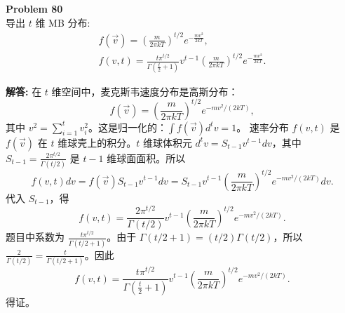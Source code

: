 \documentclass[12pt, a4paper, oneside]{ctexart}
\newenvironment{solution}{\par\noindent\textbf{解答:}\quad}{\par}
\begin{document}
\begin{mdframed}[backgroundcolor=gray!10, linewidth=0pt]
    \textbf{Problem 80} \\
    导出 $t$ 维 MB 分布:
    \[
    \begin{gathered}
        f(\vec{v}) = \left( \frac{m}{2\pi kT} \right)^{t/2} e^{-\frac{m v^2}{2kT}}, \\
        f(v, t) = \frac{t \pi^{t/2}}{\Gamma(\frac{t}{2}+1)} v^{t-1} \left( \frac{m}{2\pi kT} \right)^{t/2} e^{-\frac{m v^2}{2kT}}.
    \end{gathered}
    \]
\end{mdframed}
\begin{solution}
    在 $t$ 维空间中，麦克斯韦速度分布是高斯分布：
    \[
    f(\vec{v}) = \left( \frac{m}{2\pi kT} \right)^{t/2} e^{-m v^2/(2kT)},
    \]
    其中 $v^2 = \sum_{i=1}^t v_i^2$。这是归一化的：$\int f(\vec{v}) d^t v = 1$。
    速率分布 $f(v, t)$ 是 $f(\vec{v})$ 在 $t$ 维球壳上的积分。$t$ 维球体积元 $d^t v = S_{t-1} v^{t-1} dv$，其中 $S_{t-1} = \frac{2 \pi^{t/2}}{\Gamma(t/2)}$ 是 $t-1$ 维球面面积。所以
    \[
    f(v, t) dv = f(\vec{v}) S_{t-1} v^{t-1} dv = S_{t-1} v^{t-1} \left( \frac{m}{2\pi kT} \right)^{t/2} e^{-m v^2/(2kT)} dv.
    \]
    代入 $S_{t-1}$，得
    \[
    f(v, t) = \frac{2 \pi^{t/2}}{\Gamma(t/2)} v^{t-1} \left( \frac{m}{2\pi kT} \right)^{t/2} e^{-m v^2/(2kT)}.
    \]
    题目中系数为 $\frac{t \pi^{t/2}}{\Gamma(t/2+1)}$。由于 $\Gamma(t/2+1) = (t/2) \Gamma(t/2)$，所以 $\frac{2}{\Gamma(t/2)} = \frac{t}{\Gamma(t/2+1)}$。因此
    \[
    f(v, t) = \frac{t \pi^{t/2}}{\Gamma(\frac{t}{2}+1)} v^{t-1} \left( \frac{m}{2\pi kT} \right)^{t/2} e^{-m v^2/(2kT)}.
    \]
    得证。
\end{solution}
\end{document}
